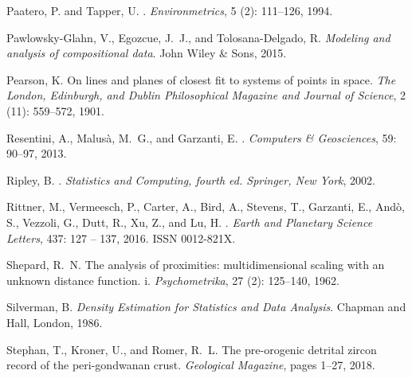 \documentclass[11pt]{article}
\begin{document}
\begin{thebibliography}{68}
Paatero, P. and Tapper, U.
.
\newblock \emph{Environmetrics}, 5 (2): 111--126, 1994.

Pawlowsky-Glahn, V., Egozcue, J.~J., and Tolosana-Delgado, R.
\newblock \emph{Modeling and analysis of compositional data}.
\newblock John Wiley \& Sons, 2015.

Pearson, K.
\newblock On lines and planes of closest fit to systems of points in space.
\newblock \emph{The London, Edinburgh, and Dublin Philosophical Magazine and
  Journal of Science}, 2 (11): 559--572, 1901.

Resentini, A., Malus{\`a}, M.~G., and Garzanti, E.
.
\newblock \emph{Computers \& Geosciences}, 59: 90--97, 2013.

Ripley, B.
.
\newblock \emph{Statistics and Computing, fourth ed. Springer, New York}, 2002.

Rittner, M., Vermeesch, P., Carter, A., Bird, A., Stevens, T., Garzanti, E.,
  And\`{o}, S., Vezzoli, G., Dutt, R., Xu, Z., and Lu, H.
.
\newblock \emph{Earth and Planetary Science Letters}, 437: 127 -- 137,
  2016.
\newblock ISSN 0012-821X.

Shepard, R.~N.
\newblock The analysis of proximities: multidimensional scaling with an unknown
  distance function. i.
\newblock \emph{Psychometrika}, 27 (2): 125--140, 1962.

Silverman, B.
\newblock \emph{Density Estimation for Statistics and Data Analysis}.
\newblock Chapman and Hall, London, 1986.

Stephan, T., Kroner, U., and Romer, R.~L.
\newblock The pre-orogenic detrital zircon record of the peri-gondwanan crust.
\newblock \emph{Geological Magazine}, pages 1--27, 2018.


\end{thebibliography}
\end{document}

